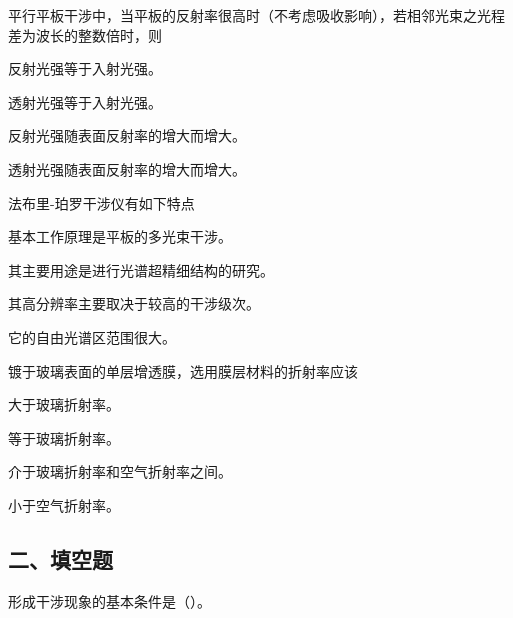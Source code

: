 \documentclass[padl, analysis, notocnum]{ExBook}
\newcommand{\answerarea}[1][3.5cm]{%
  \par\vspace{1mm}%
  \noindent{\color{themeColor!35}\rule{\linewidth}{0.4pt}}\par
  \noindent\begin{minipage}[t][#1][t]{\linewidth}\vspace{0pt}\end{minipage}\par
  \noindent{\color{themeColor!35}\rule{\linewidth}{0.4pt}}\par
}
\begin{document}
\begin{qitems}[startnum=18]
\qitem 平行平板干涉中，当平板的反射率很高时（不考虑吸收影响），若相邻光束之光程差为波长的整数倍时，则
\par\noindent\hspace{2em}反射光强等于入射光强。
\par\noindent\hspace{2em}透射光强等于入射光强。
\par\noindent\hspace{2em}反射光强随表面反射率的增大而增大。
\par\noindent\hspace{2em}透射光强随表面反射率的增大而增大。
\label{q:221:start}
\answerarea[4.0cm]
\label{q:221:end}
\end{qitems}

\begin{qitems}[startnum=19]
\qitem 法布里-珀罗干涉仪有如下特点
\par\noindent\hspace{2em}基本工作原理是平板的多光束干涉。
\par\noindent\hspace{2em}其主要用途是进行光谱超精细结构的研究。
\par\noindent\hspace{2em}其高分辨率主要取决于较高的干涉级次。
\par\noindent\hspace{2em}它的自由光谱区范围很大。
\label{q:222:start}
\answerarea[4.0cm]
\label{q:222:end}
\end{qitems}

\begin{qitems}[startnum=20]
\qitem 镀于玻璃表面的单层增透膜，选用膜层材料的折射率应该
\par\noindent\hspace{2em}大于玻璃折射率。
\par\noindent\hspace{2em}等于玻璃折射率。
\par\noindent\hspace{2em}介于玻璃折射率和空气折射率之间。
\par\noindent\hspace{2em}小于空气折射率。
\label{q:223:start}
\answerarea[4.0cm]
\label{q:223:end}
\end{qitems}

\subsection{二、填空题}
\begin{qitems}[startnum=1]
\qitem 形成干涉现象的基本条件是（\hspace{1.6em}）。
\label{q:224:start}
\answerarea[4.0cm]
\label{q:224:end}
\end{qitems}
\end{document}
